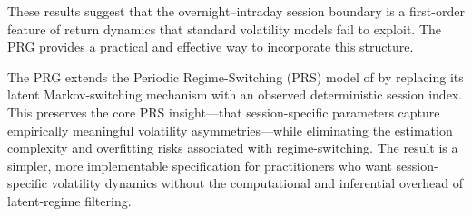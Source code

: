 \documentclass[11pt,a4paper]{article}
\begin{document}
These results suggest that the overnight--intraday session boundary is a first-order feature of return dynamics that standard volatility models fail to exploit. The PRG provides a practical and effective way to incorporate this structure.

The PRG extends the Periodic Regime-Switching (PRS) model of \citet{Lai2024} by replacing its latent Markov-switching mechanism with an observed deterministic session index. This preserves the core PRS insight---that session-specific parameters capture empirically meaningful volatility asymmetries---while eliminating the estimation complexity and overfitting risks associated with regime-switching. The result is a simpler, more implementable specification for practitioners who want session-specific volatility dynamics without the computational and inferential overhead of latent-regime filtering.



\end{document}
